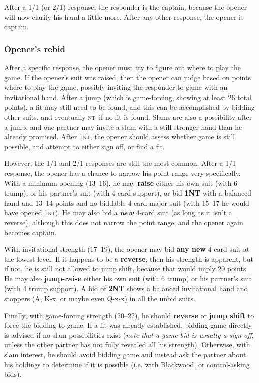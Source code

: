 \documentclass[11pt]{article}
\def\NT{\textsc{nt}}
\begin{document}
After a 1/1 (or 2/1) response, the responder is the captain, because the
opener will now clarify his hand a little more.  After any other
response, the opener is captain.

\subsubsection{Opener's rebid}

After a specific response, the opener must try to figure out where
to play the game.  If the opener's suit was raised, then the opener
can judge based on points where to play the game, possibly inviting
the responder to game with an invitational hand.  After a jump (which
is game-forcing, showing at least 26 total points), a fit may still
need to be found, and this can be accomplished by bidding other
suits, and eventually \NT\ if no fit is found.  Slams are also
a possibility after a jump, and one partner may invite a slam
with a still-stronger hand than he already promised.  After 1\NT,
the opener should assess whether game is still possible, and attempt
to either sign off, or find a fit.

However, the 1/1 and 2/1 responses are still the most common.  After a
1/1 response, the opener has a chance to narrow his point range very
specifically.  With a minimum opening (13--16), he may \textbf{raise}
either his own suit (with 6 trump), or his partner's suit (with 4-card
support), or bid \textbf{1NT} with a balanced hand and 13--14 points
and no biddable 4-card major suit (with 15--17 he would have opened
1\NT).  He may also bid a \textbf{\emph{new}} 4-card suit (as long as
it isn't a reverse), although this does not narrow the point range,
and the opener again becomes captain.

With invitational strength (17--19), the opener may bid \textbf{any
new} 4-card suit at the lowest level.  If it happens to be a \textbf{reverse},
then his strength is apparent, but if not, he is still not allowed to
jump shift, because that would imply 20 points.  He may also
\textbf{jump-raise} either his own suit (with 6 trump) or his partner's suit
(with 4 trump support).  A bid of \textbf{2NT} shows a balanced invitational
hand and stoppers (A, K-x, or maybe even Q-x-x) in all the unbid suits.

Finally, with game-forcing strength (20--22), he should
\textbf{reverse} or \textbf{jump shift} to force the bidding to game.
If a fit was already established, bidding game directly is advised if
no slam possibilities exist (\emph{note that a game bid is usually a sign
off}, unless the other partner has not fully revealed all his
strength).  Otherwise, with slam interest, he should avoid bidding
game and instead ask the partner about his holdings to determine if it
is possible (i.e. with Blackwood, or control-asking bids).
\end{document}
